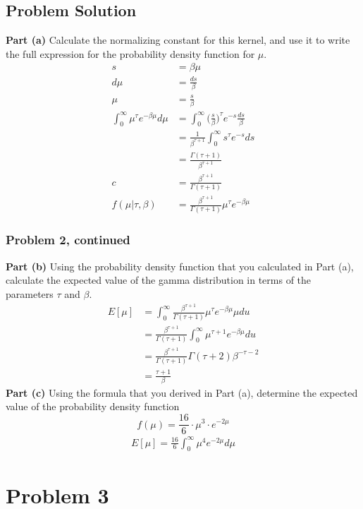 \documentclass[12pt]{article}
\theoremstyle{definition}
\begin{document}
\subsection*{Problem Solution}

\noindent
{\bf Part (a)} Calculate the normalizing constant for this kernel, and use it to write the full expression for the probability density function for $\mu$.
\begin{align*}
s &= \beta\mu\\
d\mu &= \frac{ds}{\beta}\\
\mu &= \frac{s}{\beta}\\
\int_0^\infty \mu^\tau e^{-\beta\mu}d\mu &= \int_0^\infty \biggr(\frac{s}{\beta}\biggr)^\tau e^{-s}\frac{ds}{\beta}\\
&= \frac{1}{\beta^{\tau + 1}} \int_0^\infty s^\tau e^{-s}ds\\
&= \frac{\Gamma(\tau + 1)}{\beta^{\tau + 1}}\\
c &= \frac{\beta^{\tau + 1}}{\Gamma(\tau + 1)}\\
f(\mu|\tau, \beta) &= \frac{\beta^{\tau + 1}}{\Gamma(\tau + 1)} \mu^\tau e^{-\beta\mu}
\end{align*}
\newpage
\subsubsection*{Problem 2, continued}

\noindent
{\bf Part (b)} Using the probability density function that you calculated in Part (a), calculate the expected value of the gamma distribution in terms of the parameters $\tau$ and $\beta$.
\begin{align*}
E[\mu] &= \int_0^\infty \frac{\beta^{\tau + 1}}{\Gamma(\tau + 1)} \mu^\tau e^{-\beta\mu} \mu du\\
&= \frac{\beta^{\tau + 1}}{\Gamma(\tau + 1)} \int_0^\infty \mu^{\tau + 1} e^{-\beta\mu} du\\
&= \frac{\beta^{\tau + 1}}{\Gamma(\tau + 1)} \Gamma(\tau + 2)\beta^{-\tau - 2}\\
&= \frac{\tau + 1}{\beta}
\end{align*}
\noindent
{\bf Part (c)} Using the formula that you derived in Part (a), determine the expected value of the probability density function
$$
f(\mu) = \frac{16}{6} \cdot \mu^3 \cdot e^{-2\mu}
$$
\begin{align*}
E[\mu] = \frac{16}{6} \int_0^\infty \mu^4 e^{-2\mu} d\mu
\end{align*}

\newpage
\section*{Problem 3}
\end{document}
